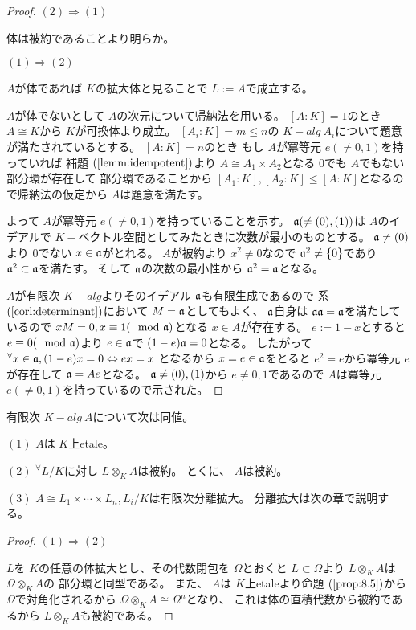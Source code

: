 \documentclass[../master_galois_theory]{subfiles}
\begin{document}
\begin{proof}
  $(2) \Rightarrow (1)$

  体は被約であることより明らか。

  $(1) \Rightarrow (2)$

  $A$が体であれば $K$の拡大体と見ることで $L := A$で成立する。

  $A$が体でないとして $A$の次元について帰納法を用いる。
  $[A:K] = 1$のとき $A \cong K$から $K$が可換体より成立。
  $[A_i:K] = m \leq n$の $K-alg \  A_i$について題意が満たされているとする。
  $[A:K] = n$のとき
  もし $A$が冪等元 $e (\neq 0 , 1)$を持っていれば
  補題 $(\mathrm{\ref{lemm:idempotent}})$より
  $A \cong A_1 \times A_2$となる $0$でも $A$でもない部分環が存在して
  部分環であることから $[A_1:K] , [A_2:K] \leq [A:K]$となるので帰納法の仮定から
  $A$は題意を満たす。

  よって $A$が冪等元 $e (\neq 0 , 1)$を持っていることを示す。
  $\mathfrak{a} (\neq (0) , (1))$は $A$のイデアルで
  $K-$ベクトル空間としてみたときに次数が最小のものとする。
  $\mathfrak{a} \neq (0)$より $0$でない $x \in \mathfrak{a}$がとれる。
  $A$が被約より $x^2 \neq 0$なので $\mathfrak{a}^2 \neq \{ 0 \}$であり
  $\mathfrak{a}^2 \subset \mathfrak{a}$を満たす。
  そして $\mathfrak{a}$の次数の最小性から $\mathfrak{a}^2 = \mathfrak{a}$となる。

  $A$が有限次 $K-alg$よりそのイデアル $\mathfrak{a}$も有限生成であるので
  系 $(\mathrm{\ref{corl:determinant}})$において $M = \mathfrak{a}$としてもよく、
  $\mathfrak{a}$自身は $\mathfrak{a} \mathfrak{a} = \mathfrak{a}$を満たしているので
  $x M = 0 , x \equiv 1 (\mod {\mathfrak{a}})$となる $x \in A$が存在する。
  $e := 1 - x$とすると $e \equiv 0 (\mod {\mathfrak{a}})$より $e \in \mathfrak{a}$で
  $(1 - e) \mathfrak{a} = 0$となる。
  したがって ${}^\forall x \in \mathfrak{a} , (1 - e)x = 0 \Leftrightarrow ex = x$
  となるから $x = e \in \mathfrak{a}$をとると $e^2 = e$から冪等元 $e$が存在して
  $\mathfrak{a} = Ae$となる。
  $\mathfrak{a} \neq (0) , (1)$から $e \neq 0 , 1$であるので
  $A$は冪等元 $e (\neq 0 , 1)$を持っているので示された。
\end{proof}

\begin{theo}
  有限次 $K-alg \  A$について次は同値。

  $(1)$
  $A$は $K$上\rm{etale}。

  $(2)$
  ${}^\forall L/K$に対し $L \otimes_K A$は被約。
  とくに、 $A$は被約。

  $(3)$
  $A \cong L_1 \times \cdots \times L_n , L_i/K$は有限次分離拡大。
  分離拡大は次の章で説明する。
\end{theo}

\begin{proof}
  $(1) \Rightarrow (2)$

  $L$を $K$の任意の体拡大とし、その代数閉包を $\Omega$とおくと
  $L \subset \Omega$より $L \otimes_K A$は $\Omega \otimes_K A$の
  部分環と同型である。
  また、 $A$は $K$上\rm{etale}より命題 $(\mathrm{\ref{prop:8.5}})$から
  $\Omega$で対角化されるから $\Omega \otimes_K A \cong \Omega^n$となり、
  これは体の直積代数から被約であるから $L \otimes_K A$も被約である。
\end{proof}
\end{document}
